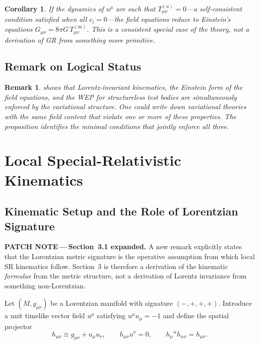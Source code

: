 \documentclass[12pt,a4paper]{article}
\newcommand{\patchnote}[1]{%
  \begin{patchbox}
    {\small\color{patchtext}\textbf{PATCH NOTE\,---\,}#1}
  \end{patchbox}}
\newtheorem{corollary}{Corollary}[proposition]
\newtheorem{remark}{Remark}
\newcommand{\Tmm}{T^{(\mathrm{m})}_{\mu\nu}}
\newcommand{\Tuu}{T^{(u)}_{\mu\nu}}
\begin{document}
\begin{corollary}
If the dynamics of $u^{\mu}$ are such that $\Tuu=0$---a self-consistent
condition satisfied when all $c_{i}=0$---the field equations reduce to
Einstein's equations $G_{\mu\nu}=8\pi G\,\Tmm$. This is a consistent
special case of the theory, not a derivation of GR from something more
primitive.
\end{corollary}

\subsection{Remark on Logical Status}

\begin{remark}
 shows that Lorentz-invariant kinematics, the Einstein form
of the field equations, and the WEP for structureless test bodies are
simultaneously enforced by the variational structure. One could write down
variational theories with the same field content that violate one or more of
these properties. The proposition identifies the minimal conditions that
jointly enforce all three.
\end{remark}

\section{Local Special-Relativistic Kinematics}
\label{sec:kinematics}

\subsection{Kinematic Setup and the Role of Lorentzian Signature}

\patchnote{\textbf{Section~3.1 expanded.}
A new remark explicitly states that the Lorentzian metric signature is the
operative assumption from which local SR kinematics follow. Section~3 is
therefore a derivation of the kinematic \emph{formulae} from the metric
structure, not a derivation of Lorentz invariance from something
non-Lorentzian.}

Let $(M,g_{\mu\nu})$ be a Lorentzian manifold with signature $(-,+,+,+)$.
Introduce a unit timelike vector field $u^{\mu}$ satisfying
$u^{\mu}u_{\mu}=-1$ and define the spatial projector
\begin{equation}
  h_{\mu\nu}\equiv g_{\mu\nu}+u_{\mu}u_{\nu},\qquad
  h_{\mu\nu}u^{\nu}=0,\qquad
  h_{\mu}{}^{\alpha}h_{\alpha\nu}=h_{\mu\nu}.
\end{equation}
\end{document}
